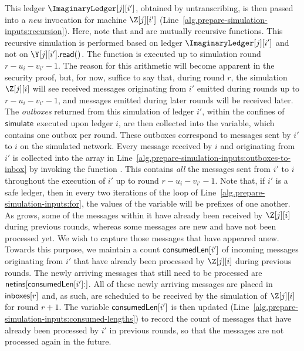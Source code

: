 This ledger $\ImaginaryLedger[j][i']$, obtained by untranscribing, is then passed into a
\emph{new} \simulate invocation for machine $\Z[j][i']$ (Line~\ref{alg.prepare-simulation-inputs:recursion}).
Here, note that \simulate and \prepareSimulationInputs are mutually recursive functions.
This recursive simulation is performed based on ledger $\ImaginaryLedger[j][i']$ and not
on $\Y[j][i'].\lread()$. The \simulate function is executed up to simulation round
$r - u_i - v_{i'} - 1$. The reason for this arithmetic will become apparent in the security proof,
but, for now, suffice to say that, during round $r$, the simulation $\Z[j][i]$ will see received messages
originating from $i'$ emitted during rounds up to $r - u_i - v_{i'} - 1$,
and messages emitted during later rounds will be received later.
The \emph{outboxes} returned from this simulation of ledger $i'$, within the confines of $\textsf{simulate}$
executed upon ledger $i$, are then collected into the \outboxes variable, which contains one outbox
per round. These outboxes correspond to messages sent by $i'$ to $i$ on the simulated network.
Every message received by $i$
and originating from $i'$ is collected into the array \netins in
Line~\ref{alg.prepare-simulation-inputs:outboxes-to-inbox} by invoking the function \outboxesToInbox.
This \netins contains \emph{all} the messages sent from $i'$ to $i$ throughout the execution
of $i'$ up to round $r - u_i - v_{i'} - 1$. Note that, if $i'$ is a safe ledger, then in every
two iterations of the loop of Line~\ref{alg.prepare-simulation-inputs:for},
the values of the variable \netins will be prefixes of one another.
As \netins grows, some of the messages within it have already been received
by $\Z[j][i]$ during previous rounds, whereas some messages are new and have not
been processed yet. We wish to capture those messages that have appeared anew.
Towards this purpose, we maintain a count $\textsf{consumedLen}[i']$ of incoming messages originating from $i'$
that have already been processed by $\Z[j][i]$ during previous rounds.
The newly arriving messages that still need to be processed are $\textsf{netins}[\textsf{consumedLen}[i']{:}]$.
All of these newly arriving messages are placed in $\textsf{inboxes}[r]$ and, as such,
are scheduled to be received by the simulation of $\Z[j][i]$ for round $r + 1$.
The variable $\textsf{consumedLen}[i']$ is then updated (Line~\ref{alg.prepare-simulation-inputs:consumed-lengths})
to record the count of messages that have already been processed by $i'$ in
previous rounds, so that the messages are not processed again in the future.

